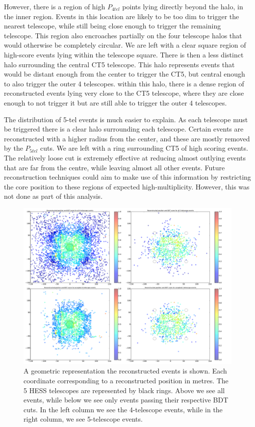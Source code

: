 \documentclass[11pt]{article}
\begin{document}
However, there is a region of high $P_{4tel}$ points lying directly beyond the halo, in the inner region. Events in this location are likely to be too dim to trigger the nearest telescope, while still being close enough to trigger the remaining telescope. This region also encroaches partially on the four telescope halos that would otherwise be completely circular. We are left with a clear square region of high-score events lying within the telescope square. There is then a less distinct halo surrounding the central CT5 telescope. This halo represents events that would be distant enough from the center to trigger the CT5, but central enough to also trigger the outer 4 telescopes. within this halo, there is a dense region of reconstructed events lying very close to the CT5 telescope, where they are close enough to not trigger it but are still able to trigger the outer 4 telescopes.

The distribution of 5-tel events is much easier to explain. As each telescope must be triggered there is a clear halo surrounding each telescope. Certain events are reconstructed with a higher radius from the center, and these are mostly removed by the $P_{5tel}$ cuts. We are left with a ring surrounding CT5 of high scoring events. The relatively loose cut is extremely effective at reducing almost outlying events that are far from the centre, while leaving almost all other events. Future reconstruction techniques could aim to make use of this information by restricting the core position to these regions of expected high-multiplicity. However, this was not done as part of this analysis. 

\begin{figure}
\begin{center}
\includegraphics[width=\textwidth]{bdtmap}
\caption{A geometric representation the reconstructed events is shown. Each coordinate corresponding to a reconstructed position in metres. The 5 HESS telescopes are represented by black rings. Above we see all events, while below we see only events passing their respective BDT cuts. In the left column we see the 4-telescope events, while in the right column, we see 5-telescope events.}
\label{fig:bdtmap}
\end{center}
\end{figure}
\end{document}
